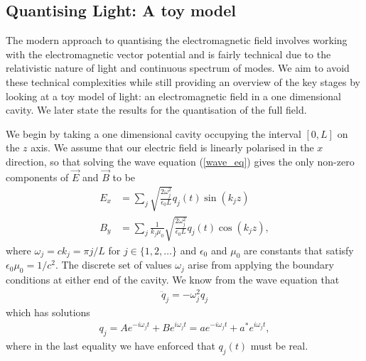 \subsection{Quantising Light: A toy model}

The modern approach to quantising the electromagnetic field involves working with the electromagnetic vector potential and is fairly technical due to the relativistic nature of light and continuous spectrum of modes. We aim to avoid these technical complexities while still providing an overview of the key stages by looking at a toy model of light: an electromagnetic field in a one dimensional cavity. We later state the results for the quantisation of the full field.

We begin by taking a one dimensional cavity occupying the interval $[0, L]$ on the $z$ axis. We assume that our electric field is linearly polarised in the $x$ direction, so that solving the wave equation (\ref{wave_eq}) gives the only non-zero components of $\vec{E}$ and $\vec{B}$ to be
\begin{align}\label{toy_classical_e}
  E_x &= \sum_j \sqrt{\frac{2\omega_j^2}{\epsilon_0 L}} q_j(t) \sin(k_j z) \\
  B_y &= \sum_j \frac{1}{k_j \mu_0} \sqrt{\frac{2\omega_j^2}{\epsilon_0 L}} q_j(t) \cos(k_j z),
\end{align}
where $\omega_j = ck_j = \pi j/L$ for $j \in \{1, 2, \dots\}$ and $\epsilon_0$ and $\mu_0$ are constants that satisfy $\epsilon_0 \mu_0 = 1/c^2$. The discrete set of values $\omega_j$ arise from applying the boundary conditions at either end of the cavity. We know from the wave equation that
\begin{align}
  \ddot{q}_j = -\omega_j^2 q_j
\end{align}
which has solutions
\begin{align}\label{classical_q}
  q_j = Ae^{-i\omega_j t} + Be^{i\omega_j t} = ae^{-i\omega_j t} + a^*e^{i\omega_j t},
\end{align}
where in the last equality we have enforced that $q_j(t)$ must be real.

